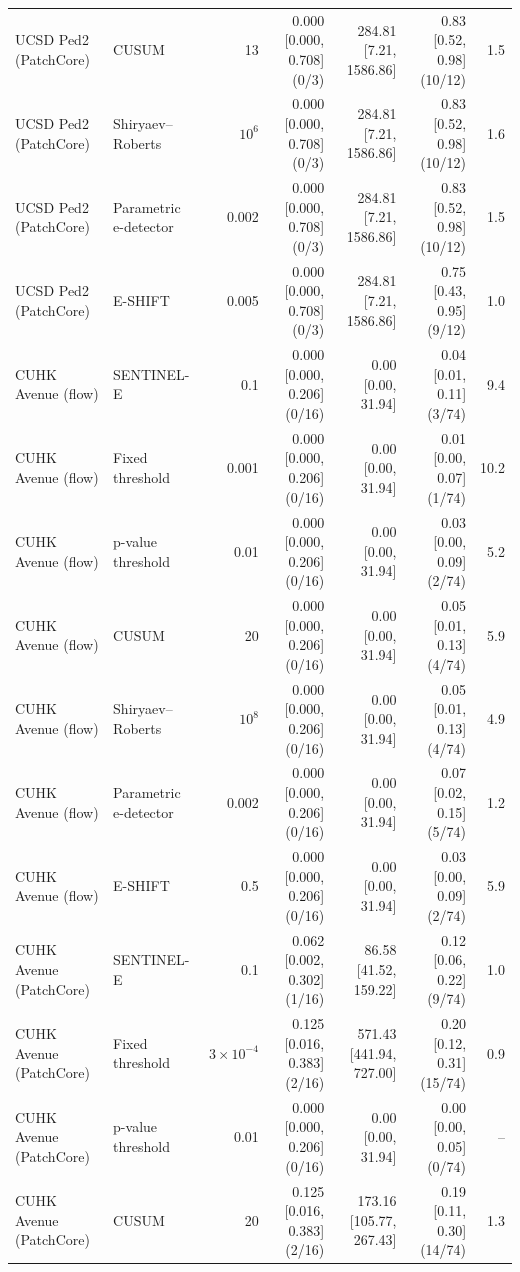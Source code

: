 \begin{table}[t]
{\begin{tabular}{llrrrrr}
UCSD Ped2 (PatchCore) & CUSUM & 13 & 0.000 [0.000, 0.708] (0/3) & 284.81 [7.21, 1586.86] & 0.83 [0.52, 0.98] (10/12) & 1.5 \\
UCSD Ped2 (PatchCore) & Shiryaev--Roberts & $10^{6}$ & 0.000 [0.000, 0.708] (0/3) & 284.81 [7.21, 1586.86] & 0.83 [0.52, 0.98] (10/12) & 1.6 \\
UCSD Ped2 (PatchCore) & Parametric e-detector & 0.002 & 0.000 [0.000, 0.708] (0/3) & 284.81 [7.21, 1586.86] & 0.83 [0.52, 0.98] (10/12) & 1.5 \\
UCSD Ped2 (PatchCore) & E-SHIFT & 0.005 & 0.000 [0.000, 0.708] (0/3) & 284.81 [7.21, 1586.86] & 0.75 [0.43, 0.95] (9/12) & 1.0 \\
CUHK Avenue (flow) & SENTINEL-E & 0.1 & 0.000 [0.000, 0.206] (0/16) & 0.00 [0.00, 31.94] & 0.04 [0.01, 0.11] (3/74) & 9.4 \\
CUHK Avenue (flow) & Fixed threshold & 0.001 & 0.000 [0.000, 0.206] (0/16) & 0.00 [0.00, 31.94] & 0.01 [0.00, 0.07] (1/74) & 10.2 \\
CUHK Avenue (flow) & p-value threshold & 0.01 & 0.000 [0.000, 0.206] (0/16) & 0.00 [0.00, 31.94] & 0.03 [0.00, 0.09] (2/74) & 5.2 \\
CUHK Avenue (flow) & CUSUM & 20 & 0.000 [0.000, 0.206] (0/16) & 0.00 [0.00, 31.94] & 0.05 [0.01, 0.13] (4/74) & 5.9 \\
CUHK Avenue (flow) & Shiryaev--Roberts & $10^{8}$ & 0.000 [0.000, 0.206] (0/16) & 0.00 [0.00, 31.94] & 0.05 [0.01, 0.13] (4/74) & 4.9 \\
CUHK Avenue (flow) & Parametric e-detector & 0.002 & 0.000 [0.000, 0.206] (0/16) & 0.00 [0.00, 31.94] & 0.07 [0.02, 0.15] (5/74) & 1.2 \\
CUHK Avenue (flow) & E-SHIFT & 0.5 & 0.000 [0.000, 0.206] (0/16) & 0.00 [0.00, 31.94] & 0.03 [0.00, 0.09] (2/74) & 5.9 \\
CUHK Avenue (PatchCore) & SENTINEL-E & 0.1 & 0.062 [0.002, 0.302] (1/16) & 86.58 [41.52, 159.22] & 0.12 [0.06, 0.22] (9/74) & 1.0 \\
CUHK Avenue (PatchCore) & Fixed threshold & $3\times 10^{-4}$ & 0.125 [0.016, 0.383] (2/16) & 571.43 [441.94, 727.00] & 0.20 [0.12, 0.31] (15/74) & 0.9 \\
CUHK Avenue (PatchCore) & p-value threshold & 0.01 & 0.000 [0.000, 0.206] (0/16) & 0.00 [0.00, 31.94] & 0.00 [0.00, 0.05] (0/74) & -- \\
CUHK Avenue (PatchCore) & CUSUM & 20 & 0.125 [0.016, 0.383] (2/16) & 173.16 [105.77, 267.43] & 0.19 [0.11, 0.30] (14/74) & 1.3 \\

\end{tabular}}
\end{table}
